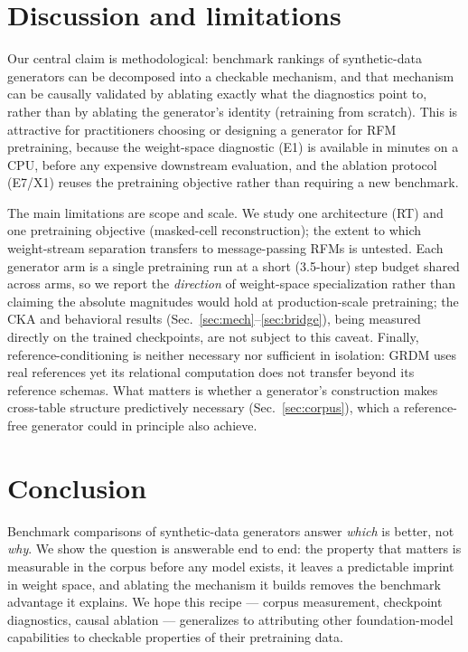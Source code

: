 \documentclass{article}
\begin{document}
\section{Discussion and limitations}

Our central claim is methodological: benchmark rankings of synthetic-data generators can be decomposed into a checkable mechanism, and that mechanism can be causally validated by ablating exactly what the diagnostics point to, rather than by ablating the generator's identity (retraining from scratch). This is attractive for practitioners choosing or designing a generator for RFM pretraining, because the weight-space diagnostic (E1) is available in minutes on a CPU, before any expensive downstream evaluation, and the ablation protocol (E7/X1) reuses the pretraining objective rather than requiring a new benchmark.

The main limitations are scope and scale. We study one architecture (RT) and one pretraining objective (masked-cell reconstruction); the extent to which weight-stream separation transfers to message-passing RFMs is untested. Each generator arm is a single pretraining run at a short (3.5-hour) step budget shared across arms, so we report the \emph{direction} of weight-space specialization rather than claiming the absolute magnitudes would hold at production-scale pretraining; the CKA and behavioral results (Sec.~\ref{sec:mech}--\ref{sec:bridge}), being measured directly on the trained checkpoints, are not subject to this caveat. Finally, reference-conditioning is neither necessary nor sufficient in isolation: GRDM uses real references yet its relational computation does not transfer beyond its reference schemas. What matters is whether a generator's construction makes cross-table structure predictively necessary (Sec.~\ref{sec:corpus}), which a reference-free generator could in principle also achieve.

\section{Conclusion}

Benchmark comparisons of synthetic-data generators answer \emph{which} is better, not \emph{why}. We show the question is answerable end to end: the property that matters is measurable in the corpus before any model exists, it leaves a predictable imprint in weight space, and ablating the mechanism it builds removes the benchmark advantage it explains. We hope this recipe --- corpus measurement, checkpoint diagnostics, causal ablation --- generalizes to attributing other foundation-model capabilities to checkable properties of their pretraining data.
\end{document}
